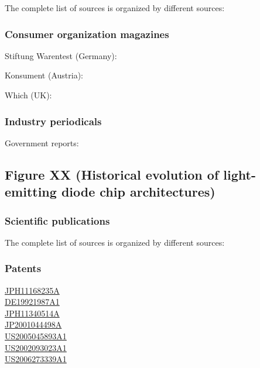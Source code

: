 \documentclass[10pt]{article}
\begin{document}
The complete list of sources is organized by different sources:

\subsubsection{Consumer organization magazines}

Stiftung Warentest (Germany): \cite{Warentest2008}\cite{Warentest2009_1}\cite{Warentest2009_2}\cite{Warentest2010_1}\cite{Warentest2010_2}\cite{Warentest2011}\cite{Warentest2012}\cite{Warentest2013}\cite{Warentest2014_1}\cite{Warentest2014_2}\cite{Warentest2015}\cite{Warentest2016_1}\cite{Warentest2016_2}\cite{Warentest2018}

Konsument (Austria): \cite{Konsument2010}

Which (UK): \cite{Which2020}

\subsubsection{Industry periodicals}

\cite{PM2020}

Government reports:

\cite{council2013assessment}

\subsection{Figure XX (Historical evolution of light-emitting diode chip architectures)}

\subsubsection{Scientific publications}

The complete list of sources is organized by different sources:

\cite{plossl2010wafer}\cite{bierhuizen2007performance}\cite{gencc2019distributed}\cite{chong2014performance}

\subsubsection{Patents}

\href{https://worldwide.espacenet.com/patent/search?q=pn\%3DJPH11168235A}{JPH11168235A} \\
\href{https://worldwide.espacenet.com/patent/search?q=pn\%3DDE19921987A1}{DE19921987A1} \\
\href{https://worldwide.espacenet.com/patent/search?q=pn\%3DJPH11340514A}{JPH11340514A} \\
\href{https://worldwide.espacenet.com/patent/search?q=pn\%3DJP2001044498A}{JP2001044498A} \\ 
\href{https://worldwide.espacenet.com/patent/search?q=pn\%3DUS2005045893A1}{US2005045893A1} \\ 
\href{https://worldwide.espacenet.com/patent/search?q=pn\%3DUS2002093023A1}{US2002093023A1} \\
\href{https://worldwide.espacenet.com/patent/search?q=pn\%3DUS2006273339A1}{US2006273339A1} 
\end{document}
